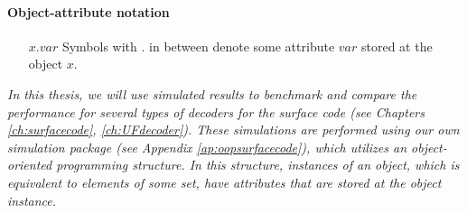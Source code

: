 \paragraph{Object-attribute notation}
\begin{itemize}[leftmargin=4em, align=left]
    \item[$x.var$]  Symbols with $.$ in between denote some attribute $var$ stored at the object $x$.
\end{itemize}
\emph{In this thesis, we will use simulated results to benchmark and compare the performance for several types of decoders for the surface code (see Chapters \ref{ch:surfacecode}, \ref{ch:UFdecoder}). These simulations are performed using our own simulation package (see Appendix \ref{ap:oopsurfacecode}), which utilizes an object-oriented programming structure. In this structure, instances of an object, which is equivalent to elements of some set, have attributes that are stored at the object instance.}







